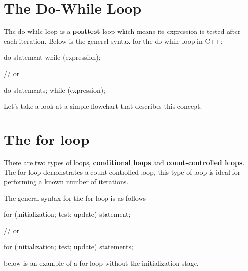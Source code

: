 \documentclass{report}
\begin{document}
    \pagebreak \bigbreak \noindent 
    \section{\LARGE The Do-While Loop}
    \bigbreak \noindent 
    \begin{concept}
 The do while loop is a \textbf{posttest} loop which means its expression is tested after each iteration. Below is the general syntax for the do-while loop in C++:
	\end{concept}
    \bigbreak \noindent 
    
    \begin{cppcode}
do 
    statement
while (expression);

// or 

do {
    statements;
} while (expression);
    \end{cppcode}
    
    \bigbreak \noindent 
    \begin{minipage}[]{0.47\textwidth}
        Let's take a look at a simple flowchart that describes this concept.
    
    \end{minipage}
    \begin{minipage}[]{0.47\textwidth}
    \end{minipage}

    \pagebreak \bigbreak \noindent 
    \section{\LARGE The for loop}
    \bigbreak \noindent 
    \begin{concept}
 There are two types of loops, \textbf{conditional loops} and \textbf{count-controlled loops}. The for loop demonstrates a count-controlled loop, this type of loop is ideal for performing a known number of iterations.
	\end{concept}
    \bigbreak \noindent 
    The general syntax for the for loop is as follows
    \bigbreak \noindent 
    
    \begin{cppcode}
for (initialization; test; update)  
    statement;

// or

for (initialization; test; update) { 
    statements;
}
    \end{cppcode}
    

    \bigbreak \noindent 
    \bigbreak \noindent 
    below is an example of a for loop without the initialization stage.
    \bigbreak \noindent 
    
\end{document}
